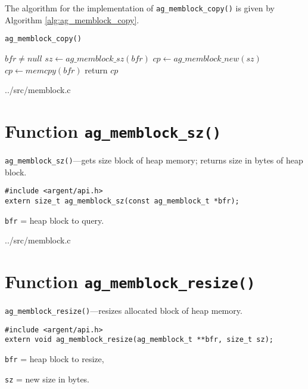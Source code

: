 The algorithm for the implementation of \verb|ag_memblock_copy()| is given by
Algorithm \ref{alg:ag_memblock_copy}.

\begin{algorithm}
\scriptsize
\caption{\texttt{ag\_memblock\_copy()}}
\label{alg:ag_memblock_copy}
\begin{algorithmic}
\Require $bfr \neq null$
\State $sz \gets ag\_memblock\_sz(bfr)$ 
\State $cp \gets ag\_memblock\_new(sz)$ 
\State $cp \gets memcpy(bfr)$ 
\State return $cp$
\EndProcedure
\end{algorithmic}
\end{algorithm}

\lstset{style=CODE}

  {../src/memblock.c}


%


\section{Function \texttt{ag\_memblock\_sz()}}

\begin{noteblock}
\small
\verb|ag_memblock_sz()|---gets size block of heap memory; returns size in bytes
of heap block.
\lstset{style=SYNOPSIS}
\begin{lstlisting}[linewidth=1.0\linewidth]
#include <argent/api.h>
extern size_t ag_memblock_sz(const ag_memblock_t *bfr);
\end{lstlisting}
\verb|bfr| = heap block to query.
\end{noteblock}

\lstset{style=CODE}

  {../src/memblock.c}


%


\section{Function \texttt{ag\_memblock\_resize()}}

\begin{noteblock}
\small
\verb|ag_memblock_resize()|---resizes allocated block of heap memory.
\lstset{style=SYNOPSIS}
\begin{lstlisting}[linewidth=1.0\linewidth]
#include <argent/api.h>
extern void ag_memblock_resize(ag_memblock_t **bfr, size_t sz);
\end{lstlisting}
\verb|bfr| = heap block to resize, \par
\verb|sz| = new size in bytes.
\end{noteblock}

